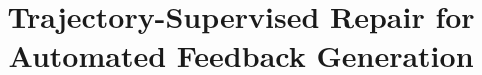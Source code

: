 \documentclass[conference]{IEEEtran}
\title{Trajectory-Supervised Repair for Automated Feedback Generation}
\begin{document}
\maketitle

\begin{abstract}

\end{abstract}
\end{document}
